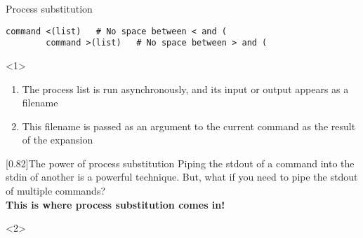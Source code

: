 \begin{frame}[fragile]{Process substitution}
    \vspace{-3mm}
    \begin{lstlisting}[style=MyBash, numbers=none]
        command <(list)   # No space between < and (
        command >(list)   # No space between > and (
    \end{lstlisting}
    \vspace{3mm}
    \begin{onlyenv}<1>
        \begin{enumerate}\small
            \item The process list is run asynchronously, and its input or output appears as a filename
            \item This filename is passed as an argument to the current command as the result of the expansion\\[0.3em]
        \end{enumerate}
        \begin{varblock}{}[0.82\textwidth]{The power of process substitution}
            Piping the stdout of a command into the stdin of another is a powerful technique.
            But, what if you need to pipe the stdout of multiple commands?\\
            \textbf{This is where process substitution comes in!}
        \end{varblock}
    \end{onlyenv}
    \begin{onlyenv}<2>
        \begin{lstlisting}[style=MyBash, xleftmargin=2mm, xrightmargin=0mm]

\end{lstlisting}
\end{onlyenv}
\end{frame}
